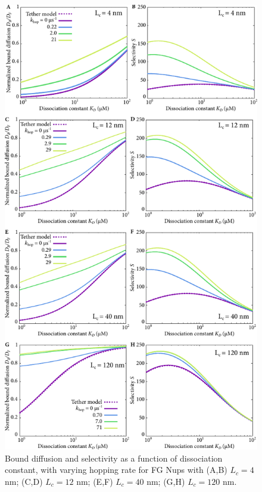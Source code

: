 \begin{figure}
\centering
\includegraphics[width=0.7\linewidth]{figs/ch02/hopping_lc4-fig.pdf}
\caption{Bound diffusion and selectivity as a function of dissociation
  constant, with varying hopping rate for FG Nups with (A,B) $L_c = 4$ nm; (C,D) $L_c = 12$ nm; (E,F) $L_c = 40$ nm; (G,H) $L_c = 120$ nm.}
\label{fig:partitioningB}
\end{figure}

